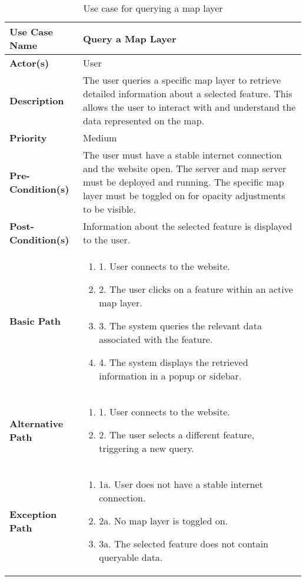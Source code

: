 \begin{table}[h]
    \centering
    \renewcommand{\arraystretch}{1.5}
    \begin{tabularx}{\textwidth}{|l|X|}
        \hline
        \rowcolor{gray!20}
        \textbf{Use Case Name} & Query a Map Layer \\
        \hline
        \textbf{Actor(s)} & User \\
        \hline
        \textbf{Description} & The user queries a specific map layer to retrieve detailed information about a selected feature. This allows the user to interact with and understand the data represented on the map. \\        \hline
        \textbf{Priority} & Medium \\
        \hline
        \textbf{Pre-Condition(s)} & The user must have a stable internet connection and the website open. The server and map server must be deployed and running. The specific map layer must be toggled on for opacity adjustments to be visible. \\
        \hline
        \textbf{Post-Condition(s)} & Information about the selected feature is displayed to the user. \\
        \hline
        \textbf{Basic Path} &  
        \begin{enumerate}[label=,left=0pt]
            \item 1. User connects to the website.
            \item 2. The user clicks on a feature within an active map layer.
            \item 3. The system queries the relevant data associated with the feature.
            \item 4. The system displays the retrieved information in a popup or sidebar.
        \end{enumerate} \\
        \hline
        \textbf{Alternative Path} & 
        \begin{enumerate}[label=,left=0pt]
            \item 1. User connects to the website.
            \item 2. The user selects a different feature, triggering a new query.
        \end{enumerate} \\
        \hline
        \textbf{Exception Path} & 
        \begin{enumerate}[label=,left=0pt]
            \item 1a. User does not have a stable internet connection.
            \item 2a. No map layer is toggled on.
            \item 3a. The selected feature does not contain queryable data.
        \end{enumerate} \\
        \hline
    \end{tabularx}
    \caption*{Use case for querying a map layer}
    \label{tab:use_case_query_map_appendix}
\end{table}

